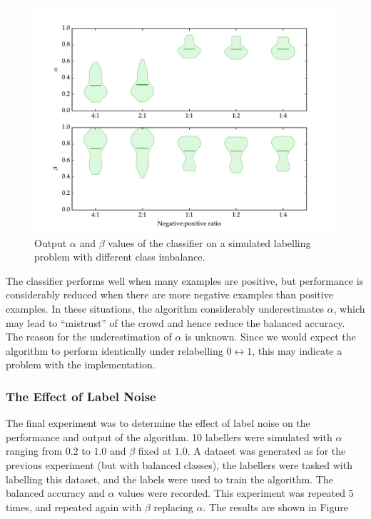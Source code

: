             \begin{figure}[!ht]
                \centering
                \includegraphics[width=\textwidth]
                    {images/experiments/raykar_class_balance}
                \caption{Output $\alpha$ and $\beta$ values of the
                    \citeauthor{raykar10} classifier on a simulated labelling
                    problem with different class imbalance.}
                \label{fig:raykar-class-balance-ab}
            \end{figure}

            The classifier performs well when many examples are positive, but
            performance is considerably reduced when there are more negative
            examples than positive examples. In these situations, the algorithm
            considerably underestimates $\alpha$, which may lead to ``mistrust'' of
            the crowd and hence reduce the balanced accuracy. The reason for the
            underestimation of $\alpha$ is unknown. Since we would expect the
            algorithm to perform identically under relabelling $0 \leftrightarrow
            1$, this may indicate a problem with the implementation.

        \subsubsection{The Effect of Label Noise}

            The final experiment was to determine the effect of label noise on the
            performance and output of the algorithm. 10 labellers were simulated
            with $\alpha$ ranging from $0.2$ to $1.0$ and $\beta$ fixed at $1.0$. A
            dataset was generated as for the previous experiment (but with balanced
            classes), the labellers were tasked with labelling this dataset, and the
            labels were used to train the algorithm. The balanced accuracy and
            $\alpha$ values were recorded. This experiment was repeated $5$ times,
            and repeated again with $\beta$ replacing $\alpha$. The results are
            shown in Figure

